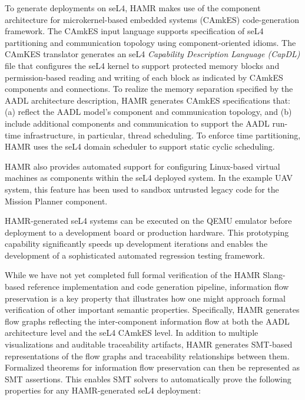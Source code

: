 To generate deployments on seL4, HAMR makes use of the
component architecture for microkernel-based embedded systems
(CAmkES) code-generation framework.   The CAmkES input
language supports specification
of seL4 partitioning and communication topology using
component-oriented idioms.  The CAmKES translator generates an
seL4 \emph{Capability Description Language (CapDL)} file that
configures the seL4 kernel to support protected memory blocks
and permission-based reading and writing of each block as
indicated by CAmkES components and connections.
To realize the memory separation specified by the AADL
architecture description, HAMR generates CAmkES specifications
that: (a) reflect the AADL model's component and communication
topology, and (b) include additional components and communication
to support the AADL run-time infrastructure, in particular,
thread scheduling.
To enforce time partitioning, HAMR uses the seL4 domain
scheduler to support static cyclic scheduling. 

HAMR also provides automated support for configuring Linux-based
virtual machines as components within the seL4 deployed system. 
In the example UAV system, this feature has been used to sandbox untrusted legacy code
for the Mission Planner component.


HAMR-generated seL4 systems can be executed on the QEMU emulator
before deployment to a development board or
production hardware.  This prototyping capability significantly speeds up development
iterations and enables the development of a sophisticated
automated regression testing framework.

While we have not yet completed full formal verification of
the HAMR Slang-based reference implementation and code generation
pipeline, information flow preservation is a key property that 
illustrates how one might approach formal verification of 
other important semantic properties.
Specifically, HAMR generates flow graphs reflecting the
inter-component information flow at both the AADL architecture
level and the seL4 CAmkES level.  In addition to multiple
visualizations and auditable traceability artifacts, HAMR
generates SMT-based representations of the flow graphs and
traceability relationships between them.  Formalized
theorems for information flow preservation can then be represented as
SMT assertions.  This enables SMT solvers to automatically prove
the following properties for any HAMR-generated seL4 deployment:

